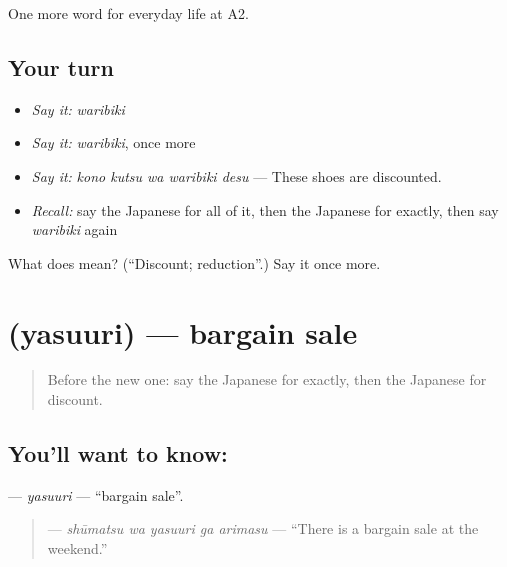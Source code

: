 \begin{grammarlens}[title={What you've built}]
One more word for everyday life at A2.
\end{grammarlens}

\subsection*{Your turn}
\begin{itemize}
\raggedright
  \item \emph{Say it:} \emph{waribiki}
  \item \emph{Say it:} \emph{waribiki}, once more
  \item \emph{Say it:} \emph{kono kutsu wa waribiki desu} — These shoes are discounted.
  \item \emph{Recall:} say the Japanese for all of it, then the Japanese for exactly, then say \emph{waribiki} again
\end{itemize}

\begin{tcolorbox}[breakable,colback=teal!4,colframe=teal!35!black,title={Before you move on}]
What does  mean? (\textquotedblleft{}Discount; reduction\textquotedblright{}.) Say it once more.
\end{tcolorbox}
\section[\texorpdfstring{\ja{やすうり} (yasuuri)}{やすうり (yasuuri)}]{ (yasuuri) — bargain sale}

\label{lesson:JA-C185-yasuuri}



\begin{quote}
Before the new one: say the Japanese for exactly, then the Japanese for discount.
\end{quote}

\subsection*{You'll want to know: }
\textbf{} — \emph{yasuuri} — \textquotedblleft{}bargain sale\textquotedblright{}.

\begin{quote}
\textbf{  } — \emph{shūmatsu wa yasuuri ga arimasu} — \textquotedblleft{}There is a bargain sale at the weekend.\textquotedblright{}
\end{quote}

